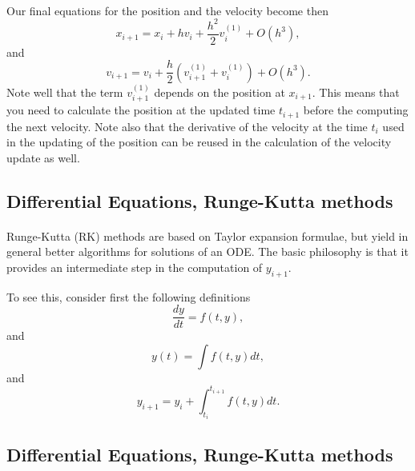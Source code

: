\documentclass[%
oneside,                 %
final,                   %
10pt]{article}
\begin{document}
\paragraph{}
Our final equations for the position and the velocity become then 
\[
x_{i+1} = x_i+hv_i+\frac{h^2}{2}v^{(1)}_{i}+O(h^3),
\]
and
\[
v_{i+1} = v_i+\frac{h}{2}\left( v^{(1)}_{i+1}+v^{(1)}_{i}\right)+O(h^3). 
\]
Note well that the term $v^{(1)}_{i+1}$ depends on the position at $x_{i+1}$. This means that you need to calculate 
the position at the updated time $t_{i+1}$ before the computing the next velocity.  Note also that the derivative of the velocity at the time
$t_i$ used in the updating of the position can be reused in the calculation of the velocity update as well.







\subsection*{Differential Equations, Runge-Kutta methods}

\paragraph{}
Runge-Kutta (RK) methods are based on Taylor expansion formulae, but yield
in general better algorithms for solutions of an ODE.
The basic philosophy is that it provides an intermediate step in the computation of $y_{i+1}$.

To see this, consider first the following definitions
\begin{equation}
   \frac{dy}{dt}=f(t,y),  
\end{equation} 
and 
\begin{equation}
   y(t)=\int f(t,y) dt,  
\end{equation} 
and 
\begin{equation}
  y_{i+1}=y_i+ \int_{t_i}^{t_{i+1}} f(t,y) dt.
\end{equation}



\subsection*{Differential Equations, Runge-Kutta methods}

\end{document}
